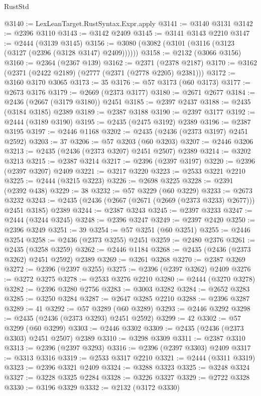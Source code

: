 \begin{lexlean}{RustStd}
\begin{coremodule}
@3140 := LexLeanTarget.RustSyntax.Expr.apply
@3141 := @3140 @3131
@3142 := @2396 @3110
@3143 := @3142 @2409
@3145 := @3141 @3143 @2210
@3147 := @2444 (@3139 @3145)
@3156 := @3080 (@3082 (@3101 (@3116 (@3123 (@3127 (@2396 (@3128 @3147) @2409))))))
@3158 := @2132 (@3066 @3156)
@3160 := @2364 (@2367 @139)
@3162 := @2371 (@2378 @2187)
@3170 := @3162 (@2371 (@2422 @2189) (@2777 (@2371 (@2778 @2205) @2381)))
@3172 := @3160 @3170 @3065
@3173 := 35
@3176 := @57 @3173 (@60 @3173)
@3177 := @2673 @3176
@3179 := @2669 (@2373 @3177)
@3180 := @2671 @2677
@3184 := @2436 (@2667 (@3179 @3180)) @2451
@3185 := @2397 @2437
@3188 := @2435 (@3184 @3185) @2389
@3189 := @2387 @3188
@3190 := @2397 @3177
@3192 := @2444 (@3189 @3190)
@3195 := @2435 (@2475 @3192) @2389
@3196 := @2387 @3195
@3197 := @2446 @1168
@3202 := @2435 (@2436 (@2373 @3197) @2451 @2592)
@3203 := 37
@3206 := @57 @3203 (@60 @3203)
@3207 := @2446 @3206
@3213 := @2435 (@2436 (@2373 @3207) @2451 @2507) @2389
@3214 := @3202 @3213
@3215 := @2387 @3214
@3217 := @2396 (@2397 @3197)
@3220 := @2396 (@2397 @3207) @2409
@3221 := @3217 @3220
@3223 := @2533 @3221 @2210
@3225 := @2444 (@3215 @3223)
@3226 := @2698 @3225
@3228 := @2391 (@2392 @438)
@3229 := 38
@3232 := @57 @3229 (@60 @3229)
@3233 := @2673 @3232
@3243 := @2435 (@2436 (@2667 (@2671 (@2669 (@2373 @3233) @2677))) @2451 @3185) @2389
@3244 := @2387 @3243
@3245 := @2397 @3233
@3247 := @2444 (@3244 @3245)
@3248 := @2396 @3247
@3249 := @2397 @2420
@3250 := @2396 @3249
@3251 := 39
@3254 := @57 @3251 (@60 @3251)
@3255 := @2446 @3254
@3258 := @2436 (@2373 @3255) @2451
@3259 := @2480 @2376
@3261 := @2435 (@3258 @3259)
@3262 := @2446 @1184
@3268 := @2435 (@2436 (@2373 @3262) @2451 @2592) @2389
@3269 := @3261 @3268
@3270 := @2387 @3269
@3272 := @2396 (@2397 @3255)
@3275 := @2396 (@2397 @3262) @2409
@3276 := @3272 @3275
@3278 := @2533 @3276 @2210
@3280 := @2444 (@3270 @3278)
@3282 := @2396 @3280 @2756
@3283 := @3003 @3282
@3284 := @2652 @3283
@3285 := @3250 @3284
@3287 := @2647 @3285 @2210
@3288 := @2396 @3287
@3289 := 41
@3292 := @57 @3289 (@60 @3289)
@3293 := @2446 @3292
@3298 := @2435 (@2436 (@2373 @3293) @2451 @2592)
@3299 := 42
@3302 := @57 @3299 (@60 @3299)
@3303 := @2446 @3302
@3309 := @2435 (@2436 (@2373 @3303) @2451 @2507) @2389
@3310 := @3298 @3309
@3311 := @2387 @3310
@3313 := @2396 (@2397 @3293)
@3316 := @2396 (@2397 @3303) @2409
@3317 := @3313 @3316
@3319 := @2533 @3317 @2210
@3321 := @2444 (@3311 @3319)
@3323 := @2396 @3321 @2409
@3324 := @3288 @3323
@3325 := @3248 @3324
@3327 := @3228 @3325 @2284
@3328 := @3226 @3327
@3329 := @2722 @3328
@3330 := @3196 @3329
@3332 := @2132 (@3172 @3330)

\end{coremodule}
\end{lexlean}
